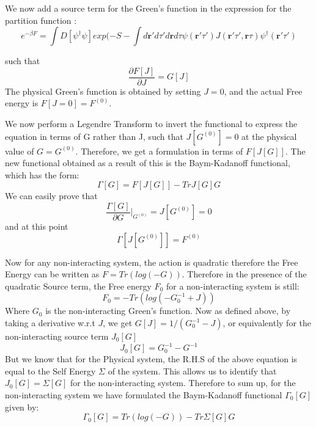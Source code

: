 \documentclass[12pt,letter]{article}
\newcommand{\rmb}{\mathbf{r}}
\begin{document}
We now add a source term for the Green's function in the expression for the partition function :
\begin{equation}
 e^{-\beta F}=\int  D [\psi^\dagger \psi] exp(-S -\int d\rmb' d\tau' d\rmb d\tau \psi(\rmb' \tau') J(\rmb' \tau', \rmb \tau)\psi ^\dagger (\rmb' \tau') 
 \end{equation}

such that 
\begin{equation}
\dfrac{\partial F[J]}{\partial J}= G[J]
\end{equation}
The physical Green's function is obtained by setting $ J=0$, and the actual Free energy is $F[J=0]=F^{(0)}$. 

We now perform a Legendre Transform to invert the functional to express the equation in terms of G rather than J, such that $J[G^{(0)}]=0$ at the physical value of $G=G^{(0)}$. 
Therefore, we get a formulation in terms of $F[J[G]]$. The new functional obtained as a result of this is the Baym-Kadanoff functional, which has the form:
\begin{equation}
\Gamma[G]= F[J[G]] -Tr J[G]G
\end{equation}
 We can easily prove that
 \begin{equation}
 \dfrac{\Gamma[G]}{\partial G}\big|_{G^{(0)}}= J[G^{(0)}]=0 
 \end{equation}
 and at this point
 \begin{equation}
 \Gamma[ J[G^{(0)}]]= F^{(0)}
 \end{equation}
 
 Now for any non-interacting system, the action is quadratic therefore the Free Energy can be written as $F=Tr(log(-G))$. Therefore in the presence of the quadratic Source term, the Free energy $F_0$ for a non-interacting system is still:
 \begin{equation}
 F_{0}= -Tr(log(-G_0^{-1} +J))
 \end{equation}
Where $G_{0}$ is the non-interacting Green's function. Now as defined above, by taking a derivative w.r.t $ J$, we get $G[J]= 1/ (G_0^{-1} -J)$, or equivalently for the non-interacting source term $J_0[G]$
\begin{equation}
 J_0[G]=G_0^{-1}- G^{-1}
 \end{equation} 
But we know that for the Physical system, the R.H.S of the above equation is equal to the Self Energy $\Sigma$ of the system. This allows us to identify that $J_0[G]=\Sigma[G]$ for the non-interacting system. Therefore to sum up, for the non-interacting system we have formulated the Baym-Kadanoff functional $\Gamma_0[G]$ given by:
\begin{equation}
\Gamma_0[G]= Tr(log(-G)) -Tr \Sigma[G]G
\end{equation}
 
\end{document}
